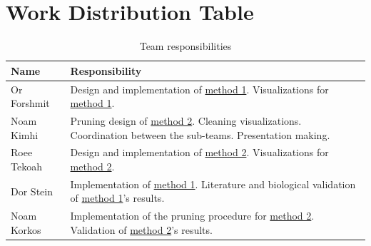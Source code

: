 \documentclass[11pt]{article}
\begin{document}
	\section{Work Distribution Table}
	\begin{table}[H]
		\centering
		\renewcommand{\arraystretch}{1.3}
		\begin{tabularx}{\textwidth}{lX}
			\toprule
			\textbf{Name} & \textbf{Responsibility} \\
			\midrule
			Or Forshmit & Design and implementation of \hyperref[subsec:method1]{method 1}. Visualizations for \hyperref[subsec:method1]{method 1}.\\
			Noam Kimhi & Pruning design of \hyperref[subsec:method2]{method 2}. Cleaning visualizations. Coordination between the sub-teams. Presentation making. \\
			Roee Tekoah & Design and implementation of \hyperref[subsec:method2]{method 2}. Visualizations for \hyperref[subsec:method2]{method 2}.\\
			Dor Stein & Implementation of \hyperref[subsec:method1]{method 1}. Literature and biological validation of \hyperref[subsec:method1]{method 1}'s results. \\
			Noam Korkos & Implementation of the pruning procedure for \hyperref[subsec:method2]{method 2}. Validation of \hyperref[subsec:method2]{method 2}'s results. \\
			\bottomrule
		\end{tabularx}
		\caption{Team responsibilities}
		\label{tab:example}
	\end{table}
	
	
	\FloatBarrier
	\newpage
	
	
	
	
	
\end{document}
